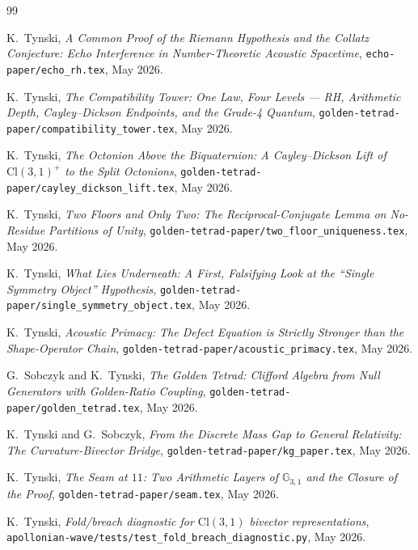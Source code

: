 \documentclass[11pt,a4paper]{article}
\theoremstyle{plain}
\theoremstyle{definition}
\theoremstyle{remark}
\numberwithin{equation}{section}
\providecommand{\Cl}{\mathrm{Cl}}
\providecommand{\GA}[2]{\mathbb{G}_{#1,#2}}
\begin{document}
\begin{thebibliography}{99}

K.~Tynski,
\emph{A Common Proof of the Riemann Hypothesis and the Collatz
Conjecture: Echo Interference in Number-Theoretic Acoustic
Spacetime}, \texttt{echo-paper/echo\_rh.tex}, May 2026.

K.~Tynski,
\emph{The Compatibility Tower: One Law, Four Levels --- RH,
Arithmetic Depth, Cayley--Dickson Endpoints, and the Grade-4
Quantum},
\texttt{golden-tetrad-paper/compatibility\_tower.tex}, May 2026.

K.~Tynski,
\emph{The Octonion Above the Biquaternion: A Cayley--Dickson Lift
of $\Cl(3,1)^+$ to the Split Octonions},
\texttt{golden-tetrad-paper/cayley\_dickson\_lift.tex}, May 2026.

K.~Tynski,
\emph{Two Floors and Only Two: The Reciprocal-Conjugate Lemma on
No-Residue Partitions of Unity},
\texttt{golden-tetrad-paper/two\_floor\_uniqueness.tex}, May 2026.

K.~Tynski,
\emph{What Lies Underneath: A First, Falsifying Look at the
``Single Symmetry Object'' Hypothesis},
\texttt{golden-tetrad-paper/single\_symmetry\_object.tex},
May 2026.

K.~Tynski,
\emph{Acoustic Primacy: The Defect Equation is Strictly Stronger
than the Shape-Operator Chain},
\texttt{golden-tetrad-paper/acoustic\_primacy.tex}, May 2026.

G.~Sobczyk and K.~Tynski,
\emph{The Golden Tetrad: Clifford Algebra from Null Generators
with Golden-Ratio Coupling},
\texttt{golden-tetrad-paper/golden\_tetrad.tex}, May 2026.

K.~Tynski and G.~Sobczyk,
\emph{From the Discrete Mass Gap to General Relativity:
The Curvature-Bivector Bridge},
\texttt{golden-tetrad-paper/kg\_paper.tex}, May 2026.

K.~Tynski,
\emph{The Seam at $11$: Two Arithmetic Layers of $\GA{3}{1}$
and the Closure of the Proof},
\texttt{golden-tetrad-paper/seam.tex}, May 2026.

K.~Tynski, \emph{Fold/breach diagnostic for $\Cl(3,1)$ bivector
representations},
\texttt{apollonian-wave/tests/test\_fold\_breach\_diagnostic.py},
May 2026.


\end{thebibliography}
\end{document}
